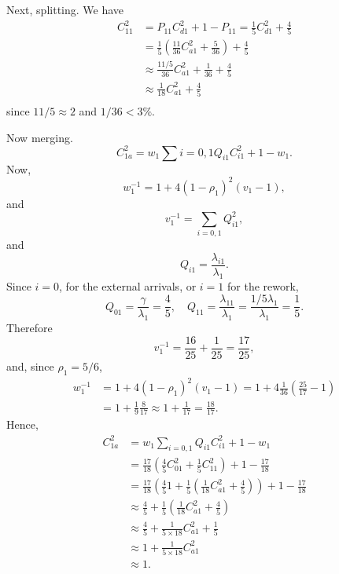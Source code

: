 \begin{exercise}
\begin{exercise}
\begin{solution}
Next, splitting. We have
\begin{equation*}
 \begin{split}
 C_{11}^2 
&= P_{11}C_{d1}^2 + 1 - P_{11} = \frac{1}{5}C_{d1}^2 + \frac 45 \\
&=\frac{1}{5}\left(\frac{11}{36}C_{a1}^2 + \frac{5}{36}\right) + \frac 45 \\ 
&\approx\frac{11/5}{36} C_{a1}^2 + \frac{1}{36} + \frac 45 \\
&\approx\frac{1}{18} C_{a1}^2 + \frac 45 \\
 \end{split}
\end{equation*}
since $11/5 \approx 2$ and $1/36 < 3\%$. 

Now merging.
\begin{equation*}
 C_{1a}^2 = w_1 \sum{i=0,1} Q_{i1} C_{i1}^2 + 1 - w_1.
\end{equation*}
Now, 
\begin{equation*}
 w_1^{-1} = 1 + 4(1-\rho_1)^2 (v_1-1),
\end{equation*}
and
\begin{equation*}
 v_1^{-1}=\sum_{i=0,1} Q_{i1}^2,
\end{equation*}
and 
\begin{equation*}
 Q_{i1} = \frac{\lambda_{i1}}{\lambda_1}.
\end{equation*}
Since $i=0$, for the external arrivals, or $i=1$ for the rework,
\begin{equation*}
 Q_{01} = \frac{\gamma}{\lambda_1} = \frac 45, \quad Q_{11}=\frac{\lambda_{11}}{\lambda_1} = \frac{1/5 \lambda_1 }{\lambda_1} = \frac 15.
\end{equation*}
Therefore
\begin{equation*}
 v_1^{-1}= \frac{16}{25}+\frac1{25} = \frac{17}{25},
\end{equation*}
and, since $\rho_1 = 5/6$,
\begin{equation*}
 \begin{split}
 w_1^{-1} 
&= 1 + 4(1-\rho_1)^2 (v_1-1) = 1 + 4\frac1{36}\left(\frac{25}{17}-1\right) \\
&= 1 + \frac1{9}\frac{8}{17} \approx 1 + \frac1{17} =\frac{18}{17}.
 \end{split}
\end{equation*}
Hence,
\begin{align*}
 C_{1a}^2 
&= w_1 \sum_{i=0,1} Q_{i1} C_{i1}^2 + 1 - w_1 \\
&= \frac{17}{18} \left(\frac 45 C_{01}^2 + \frac 1 5 C_{11}^2 \right) + 1 - \frac{17}{18}\\
&= \frac{17}{18} \left(\frac 45 1 + \frac 1 5 \left(\frac{1}{18} C_{a1}^2 + \frac 45\right)\right) + 1 - \frac{17}{18}\\
&\approx \frac 45 + \frac 1 5 \left(\frac{1}{18} C_{a1}^2 + \frac 45\right) \\
&\approx \frac 45 + \frac{1}{5\times 18} C_{a1}^2 + \frac 15 \\
&\approx 1 + \frac{1}{5\times 18} C_{a1}^2 \\
&\approx 1.
\end{align*}


\end{solution}
\end{exercise}
\end{exercise}
